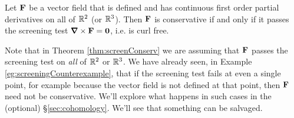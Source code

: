 \begin{theorem}\label{thm:screenConserv}
Let $\mathbf{F}$ be a vector field that is defined and has continuous 
first order partial derivatives on all of $\mathbb{R}^2$ (or $\mathbb{R}^3$).
Then $\mathbf{F}$ is conservative if and only if it passes the screening test
$\vnabla\times\vF=\vZero$, i.e. is curl free.
\end{theorem}
\begin{warning}\label{warn:screeningB}
Note that in Theorem \ref{thm:screenConserv} we are assuming that
$\mathbf{F}$ passes the screening test on \emph{all} of $\mathbb{R}^2$ or $\mathbb{R}^3$.
We have already seen, in Example \ref{eg:screeningCounterexample},
that if the screening test fails at even a single point, for example
because the vector field is not defined at that point, then $\mathbf{F}$ need 
not be conservative. We'll explore what happens in such cases in the
(optional)  \S\ref{sec:cohomology}. We'll see that something can be salvaged.
\end{warning}

